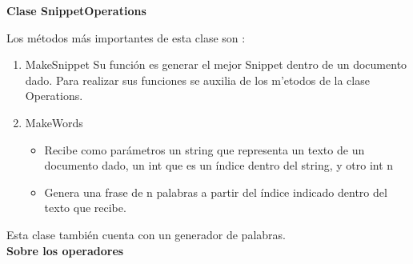 \documentclass[12pt]{article}
\begin{document}
  \textbf{  Clase SnippetOperations}
  
  Los m\'etodos m\'as importantes de esta clase son :
  
  \begin{enumerate}
  	\item MakeSnippet
  	Su funci\'on es generar el mejor Snippet dentro de un documento dado. Para realizar sus funciones se auxilia de los m'etodos de la clase Operations.
  	\item MakeWords
  \begin{itemize}
  	\item Recibe como par\'ametros un string que representa un texto de un documento dado, un int que es un \'indice dentro del string, y otro int n
  	\item Genera una frase de n palabras a partir del \'indice indicado dentro del texto que recibe.    
  	\end{itemize}
  \end{enumerate} 
   
   Esta clase tambi\'en cuenta con un generador de palabras.  \\
   
   
   \textbf{ Sobre los operadores } \\
   
\end{document}
